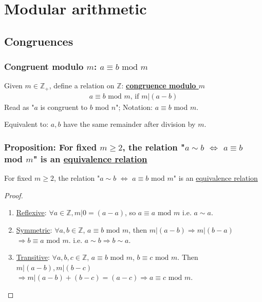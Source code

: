 \documentclass[11pt]{elegantbook}
\begin{document}
\chapter{Modular arithmetic}
\section{Congruences}
\subsection{Congruent modulo $m$: $a\equiv b \text{ mod }m$}
Given $m\in\mathbb{Z}_+$, define a relation on $\mathbb{Z}$: \underline{\textbf{congruence modulo $m$}}
\begin{equation}
    \begin{aligned}
        a\equiv b \text{ mod }m\text{, if } m|(a-b)
    \end{aligned}
    \nonumber
\end{equation}
Read as "$a$ is congruent to $b$ mod $n$"; Notation: $a\equiv b$ mod $m$.

Equivalent to: $a,b$ have the same remainder after division by $m$.
\subsection{Proposition: For fixed $m\geq 2$, the relation "$a\sim b$ $\Leftrightarrow$ $a\equiv b$ mod $m$" is an \underline{equivalence relation}}
\begin{proposition}[Proposition 1.5.1]
    For fixed $m\geq 2$, the relation "$a\sim b$ $\Leftrightarrow$ $a\equiv b$ mod $m$" is an \underline{equivalence relation}
\end{proposition}
\begin{proof}
\quad

\begin{enumerate}[1)]
    \item \underline{Reflexive}: $\forall a\in\mathbb{Z}, m|0=(a-a)$, so $a\equiv a \text{ mod }m$ i.e. $a\sim a$.
    \item \underline{Symmetric}: $\forall a,b\in\mathbb{Z}$, $a\equiv b \text{ mod }m$, then $m|(a-b)\Rightarrow m|(b-a)$$\Rightarrow b\equiv a \text{ mod }m$. i.e. $a\sim b \Rightarrow b\sim a$.
    \item \underline{Transitive}: $\forall a,b,c\in\mathbb{Z}$, $a\equiv b \text{ mod }m$, $b\equiv c \text{ mod }m$. Then $m|(a-b), m|(b-c)$ $\Rightarrow m|(a-b)+(b-c)=(a-c)\Rightarrow a\equiv c \text{ mod }m$.
\end{enumerate}
\end{proof}
\end{document}
